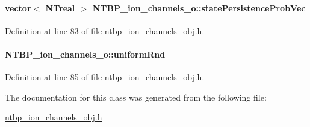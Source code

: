 \paragraph[{statePersistenceProbVec}]{\setlength{\rightskip}{0pt plus 5cm}vector$<$ {\bf NTreal} $>$ {\bf NTBP\_\-ion\_\-channels\_\-o::statePersistenceProbVec}}\hfill\label{class_n_t_b_p__ion__channels__o_a794757763f5dc40dc3f3336e96e30c0c}


Definition at line 83 of file ntbp\_\-ion\_\-channels\_\-obj.h.

\paragraph[{uniformRnd}]{ {\bf NTBP\_\-ion\_\-channels\_\-o::uniformRnd}}\hfill\label{class_n_t_b_p__ion__channels__o_a4739d0046a028f8484d0d8948f9cd5be}


Definition at line 85 of file ntbp\_\-ion\_\-channels\_\-obj.h.



The documentation for this class was generated from the following file:\begin{DoxyCompactItemize}
\item 
\hyperlink{ntbp__ion__channels__obj_8h}{ntbp\_\-ion\_\-channels\_\-obj.h}\end{DoxyCompactItemize}
